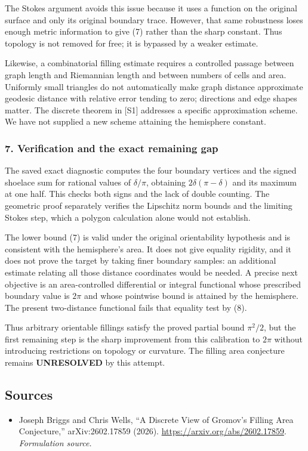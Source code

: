 \documentclass[11pt]{article}
\begin{document}
The Stokes argument avoids this issue because it uses a function on the original surface and only its original boundary trace. However, that same robustness loses enough metric information to give (7) rather than the sharp constant. Thus topology is not removed for free; it is bypassed by a weaker estimate.

Likewise, a combinatorial filling estimate requires a controlled passage between graph length and Riemannian length and between numbers of cells and area. Uniformly small triangles do not automatically make graph distance approximate geodesic distance with relative error tending to zero; directions and edge shapes matter. The discrete theorem in [S1] addresses a specific approximation scheme. We have not supplied a new scheme attaining the hemisphere constant.

\subsubsection{7. Verification and the exact remaining gap}
The saved exact diagnostic computes the four boundary vertices and the signed shoelace sum for rational values of $\delta/\pi$, obtaining $2\delta(\pi-\delta)$ and its maximum at one half. This checks both signs and the lack of double counting. The geometric proof separately verifies the Lipschitz norm bounds and the limiting Stokes step, which a polygon calculation alone would not establish.

The lower bound (7) is valid under the original orientability hypothesis and is consistent with the hemisphere's area. It does not give equality rigidity, and it does not prove the target by taking finer boundary samples: an additional estimate relating all those distance coordinates would be needed. A precise next objective is an area-controlled differential or integral functional whose prescribed boundary value is $2\pi$ and whose pointwise bound is attained by the hemisphere. The present two-distance functional fails that equality test by (8).

Thus arbitrary orientable fillings satisfy the proved partial bound $\pi^2/2$, but the first remaining step is the sharp improvement from this calibration to $2\pi$ without introducing restrictions on topology or curvature. The filling area conjecture remains \textbf{UNRESOLVED} by this attempt.

\subsection{Sources}
\begin{itemize}
\item[S1]Joseph Briggs and Chris Wells, “A Discrete View of Gromov's Filling Area Conjecture,” arXiv:2602.17859 (2026).
\url{https://arxiv.org/abs/2602.17859}.
\textit{Formulation source.}
\end{itemize}
\end{document}
